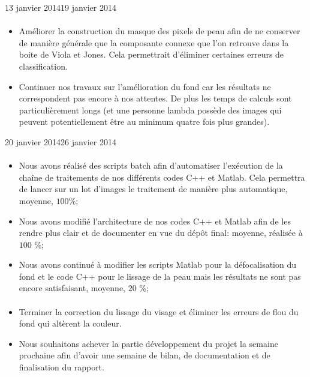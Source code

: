 \documentclass[11pt, french,screen]{report-rd-info}
\begin{document}
\begin{fichesuivi}{13 janvier 2014}{19 janvier 2014}
\paragraph*{}
	\begin{planification}
		\begin{itemize}
			\item Améliorer la construction du masque des pixels de peau afin de ne conserver de manière générale que la composante connexe que l'on retrouve dans la boite de Viola et Jones. Cela permettrait d'éliminer certaines erreurs de classification.
			\item Continuer nos travaux sur l'amélioration du fond car les résultats ne correspondent pas encore à nos attentes. De plus les temps de calculs sont particulièrement longs (et une personne lambda possède des images qui peuvent potentiellement être au minimum quatre fois plus grandes).	
\end{itemize}
	\end{planification}
\end{fichesuivi}

\begin{fichesuivi}{20 janvier 2014}{26 janvier 2014}
\paragraph{}
	\begin{travaileffectue}
		\begin{itemize}
			\item Nous avons réalisé des scripts batch afin d'automatiser l'exécution de la chaîne de  traitements de nos différents codes C++ et Matlab. Cela permettra de lancer sur un lot d'images le traitement de manière plus automatique, moyenne, $100$\%;
			\item Nous avons modifié l'architecture de nos codes C++ et Matlab afin de les rendre plus clair et de documenter en vue du dépôt final: moyenne, réalisée à $100$ \%;
			\item Nous avons continué à modifier les scripts Matlab pour la défocalisation du fond et le code C++ pour le lissage de la peau mais les résultats ne sont pas encore satisfaisant, moyenne, $20$ \%;
		\end{itemize}
	\end{travaileffectue}


\paragraph*{}
	\begin{planification}
		\begin{itemize}
			\item Terminer la correction du lissage du visage et éliminer les erreurs de flou du fond qui altèrent la couleur.
			\item Nous souhaitons achever la partie développement du projet la semaine prochaine afin d'avoir une semaine de bilan, de documentation et de finalisation du rapport.
\end{itemize}
	\end{planification}
\end{fichesuivi}
\end{document}
